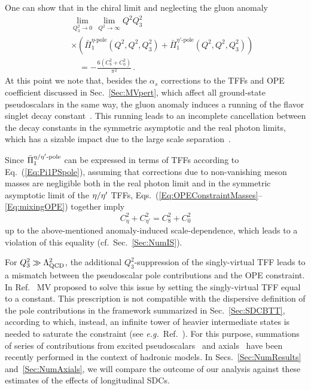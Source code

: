 One can show that in the chiral limit and neglecting the gluon anomaly~\cite{BernSDCLong}
\begin{eqnarray}
&&\lim\limits_{Q_3^2\to 0} \, \lim\limits_{Q^2\to\infty} Q^2 Q_3^2 \nonumber \\ &&\times\left(\bar{\Pi}_1^{\eta\text{-pole}}(Q^2, Q^2, Q_3^2) + \bar{\Pi}_1^{\eta'\text{-pole}}(Q^2, Q^2, Q_3^2)\right) \nonumber \\ &&\quad= -\frac{6 (C_8^2 + C_0^2)}{\pi^2}\,.
\label{Eq:mixingOPE}
\end{eqnarray}
At this point we note that, besides the $\alpha_s$ corrections to the TFFs and OPE coefficient discussed in Sec.~\ref{Sec:MVpert}, which affect all ground-state pseudoscalars in the same way, the gluon anomaly induces a running of the flavor singlet decay constant~\cite{Leutwyler:1997yr,Kaiser:1998ds,Kaiser:2000gs}. This running leads to an incomplete cancellation between the decay constants in the symmetric asymptotic and the real photon limits, which has a sizable impact due to the large scale separation~\cite{Agaev:2014wna,PabloPhD}. 

Since $\bar{\Pi}_1^{\text{${\eta / \eta'}$-pole}}$ can be expressed in terms of TFFs according to Eq.~(\ref{Eq:Pi1PSpole}), assuming that corrections due to non-vanishing meson masses are negligible both in the real photon limit and in the symmetric asymptotic limit of the ${\eta / \eta'}$ TFFs, Eqs.~(\ref{Eq:OPEConstraintMasses}--\ref{Eq:mixingOPE}) together imply
\begin{equation}
C_\eta^2 + C_{\eta'}^2= C_8^2 + C_0^2
\label{Eq:CPhysFlavor}
\end{equation}
up to the above-mentioned anomaly-induced scale-dependence, which leads to a violation of this equality (cf.\ Sec.~\ref{Sec:NumIS}).

For $Q_3^2 \gg \Lambda_\text{QCD}^2$, the additional $Q_3^2$-suppression of the singly-virtual TFF leads to a mismatch between the pseudoscalar pole contributions and the OPE constraint. In Ref.~\cite{MV} MV proposed to solve this issue by setting the singly-virtual TFF equal to a constant. This prescription is not compatible with the dispersive definition of the pole contributions in the framework summarized in Sec.~\ref{Sec:SDCBTT}, according to which, instead, an infinite tower of heavier intermediate states is needed to saturate the constraint (see {\it e.g.}\ Ref.~\cite{BernSDCLong}). For this purpose, summations of series of contributions from excited pseudoscalars~\cite{BernSDCShort,BernSDCLong} and axials~\cite{HolographyVienna,HolographyItaly} have been recently performed in the context of hadronic models. In Secs.~\ref{Sec:NumResults} and~\ref{Sec:NumAxials}, we will compare the outcome of our analysis against these estimates of the effects of longitudinal SDCs.

